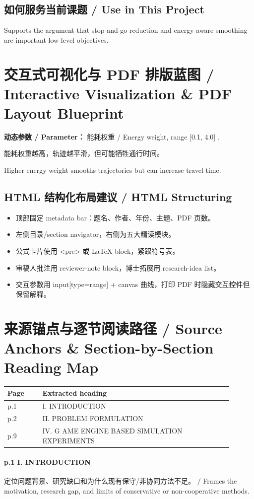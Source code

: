 \documentclass[UTF8,a4paper,11pt,fontset=fandol]{ctexart}
\begin{document}
\subsection{如何服务当前课题 / Use in This Project}
Supports the argument that stop-and-go reduction and energy-aware smoothing are important low-level objectives.

\section{交互式可视化与 PDF 排版蓝图 / Interactive Visualization \& PDF Layout Blueprint}
\textbf{动态参数 / Parameter：} 能耗权重 / Energy weight, range [0.1, 4.0] .

能耗权重越高，轨迹越平滑，但可能牺牲通行时间。

Higher energy weight smooths trajectories but can increase travel time.

\subsection{HTML 结构化布局建议 / HTML Structuring}
\begin{itemize}
\item 顶部固定 metadata bar：题名、作者、年份、主题、PDF 页数。
\item 左侧目录/section navigator，右侧为五大精读模块。
\item 公式卡片使用 <pre> 或 LaTeX block，紧跟符号表。
\item 审稿人批注用 reviewer-note block，博士拓展用 research-idea list。
\item 交互参数用 input[type=range] + canvas 曲线，打印 PDF 时隐藏交互控件但保留解释。
\end{itemize}


\section{来源锚点与逐节阅读路径 / Source Anchors \& Section-by-Section Reading Map}
\begin{longtable}{p{0.14\linewidth}p{0.76\linewidth}}
\toprule
Page & Extracted heading\\
\midrule
p.1 & I. INTRODUCTION \\
p.2 & II. PROBLEM FORMULATION \\
p.9 & IV. G AME ENGINE BASED SIMULATION EXPERIMENTS \\
\bottomrule
\end{longtable}

\paragraph{p.1 I. INTRODUCTION}定位问题背景、研究缺口和为什么现有保守/非协同方法不足。 / Frames the motivation, research gap, and limits of conservative or non-cooperative methods.
\end{document}

